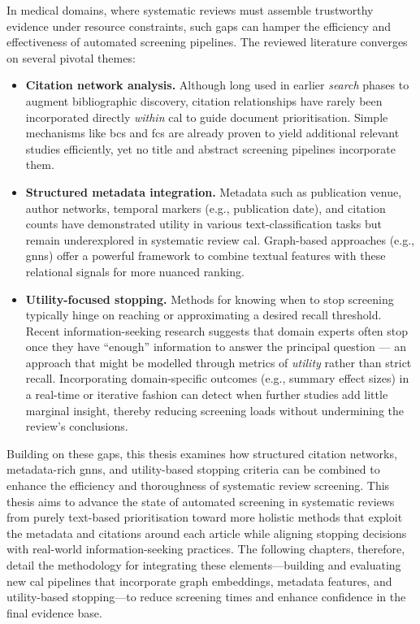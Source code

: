 \documentclass[10pt,oneside]{book}
\begin{document}
In medical domains, where systematic reviews must assemble trustworthy evidence under resource constraints, such gaps can hamper the efficiency and effectiveness of automated screening pipelines. The reviewed literature converges on several pivotal themes:

\begin{itemize} \item \textbf{Citation network analysis.} Although long used in earlier \emph{search} phases to augment bibliographic discovery, citation relationships have rarely been incorporated directly \emph{within} \gls*{cal} to guide document prioritisation. Simple mechanisms like \gls*{bcs} and \gls*{fcs} are already proven to yield additional relevant studies efficiently, yet no title and abstract screening pipelines incorporate them.

\item \textbf{Structured metadata integration.} Metadata such as publication venue, author networks, temporal markers (e.g., publication date), and citation counts have demonstrated utility in various text-classification tasks but remain underexplored in systematic review \gls*{cal}. Graph-based approaches (e.g., \glspl*{gnn}) offer a powerful framework to combine textual features with these relational signals for more nuanced ranking.

\item \textbf{Utility-focused stopping.} Methods for knowing when to stop screening typically hinge on reaching or approximating a desired recall threshold. Recent information-seeking research suggests that domain experts often stop once they have ``enough'' information to answer the principal question — an approach that might be modelled through metrics of \emph{utility} rather than strict recall. Incorporating domain-specific outcomes (e.g., summary effect sizes) in a real-time or iterative fashion can detect when further studies add little marginal insight, thereby reducing screening loads without undermining the review’s conclusions.

\end{itemize}

Building on these gaps, this thesis examines how structured citation networks, metadata-rich \glspl*{gnn}, and utility-based stopping criteria can be combined to enhance the efficiency and thoroughness of systematic review screening. This thesis aims to advance the state of automated screening in systematic reviews from purely text-based prioritisation toward more holistic methods that exploit the metadata and citations around each article while aligning stopping decisions with real-world information-seeking practices. The following chapters, therefore, detail the methodology for integrating these elements—building and evaluating new \gls*{cal} pipelines that incorporate graph embeddings, metadata features, and utility-based stopping—to reduce screening times and enhance confidence in the final evidence base.
\end{document}
